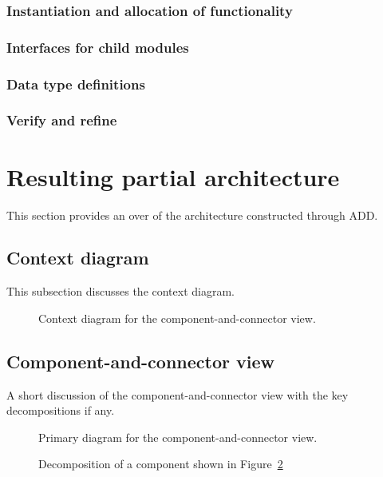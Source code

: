 \documentclass[a4paper,10pt]{article}
\begin{document}
\subsubsection{Instantiation and allocation of functionality}
\subsubsection{Interfaces for child modules}
\subsubsection{Data type definitions}
\subsubsection{Verify and refine}

\section{Resulting partial architecture}\label{sec:architecture}
This section provides an over of the architecture constructed through ADD\@.

\subsection{Context diagram}
This subsection discusses the context diagram.

\begin{figure}[!htp]
    \centering
    \caption{Context diagram for the component-and-connector view.
        }\label{fig:cc_context}
\end{figure}

\subsection{Component-and-connector view}
A short discussion of the component-and-connector view with the key
decompositions if any.

\begin{figure}[!htp]
    \centering
    \caption{Primary diagram for the component-and-connector view.
        }\label{fig:cc_main}
\end{figure}

\begin{figure}[!htp]
    \centering
    \caption{Decomposition of a component shown in Figure~\ref{fig:cc_main}
        }\label{fig:decomp_decomp1}
\end{figure}
\end{document}
